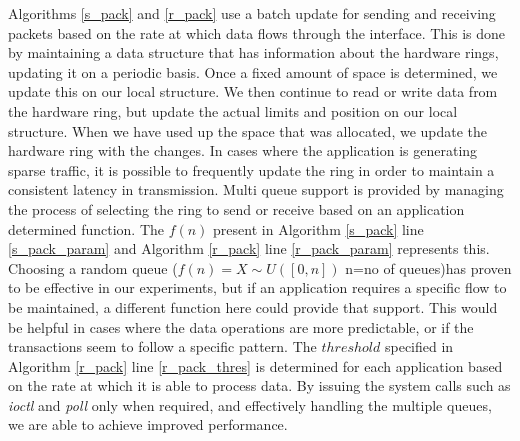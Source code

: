 \documentclass[10pt, conference, compsocconf, reqno]{IEEEtran}
\newcommand{\comment}[1]{}
\begin{document}
\comment{By minimizing the synchronizations with the hardware rings, we essentially limit the system calls issued and consequently improve the overall system performance.}










Algorithms \ref{s_pack} and \ref{r_pack} use a batch update for sending and receiving packets based on the rate at which data flows through the interface. This is done by maintaining a data structure that has information about the hardware rings, updating it on a periodic basis. Once a fixed amount of space is determined, we update this on our local structure. We then continue to read or write data from the hardware ring, but update the actual limits and position on our local structure. When we have used up the space that was allocated, we update the hardware ring with the changes. In cases where the application is generating sparse traffic, it is possible to frequently update the ring in order to maintain a consistent latency in transmission. Multi queue support is provided by managing the process of selecting the ring to send or receive based on an application determined function. The $f(n)$ present in Algorithm \ref{s_pack} line \ref{s_pack_param} and Algorithm \ref{r_pack} line \ref{r_pack_param} represents this. Choosing a random queue ($f(n)=X \sim U([0,n])$ n=no of queues)has proven to be effective in our experiments, but if an application requires a specific flow to be maintained, a different function here could provide that support. This would be helpful in cases where the data operations are more predictable, or if the transactions seem to follow a specific pattern. The $threshold$ specified in Algorithm \ref{r_pack} line \ref{r_pack_thres} is determined for each application based on the rate at which it is able to process data. By issuing the system calls such as \textit{ioctl} and \textit{poll} only when required, and effectively handling the multiple queues, we are able to achieve improved performance.


\setlength{\textfloatsep}{0pt}
\end{document}
